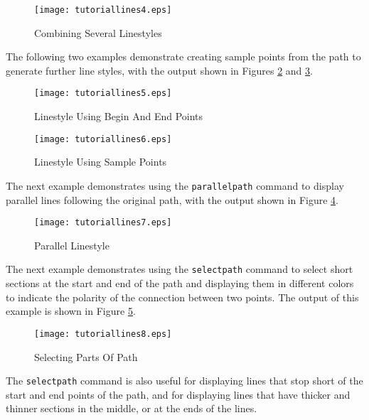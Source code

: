 \begin{figure}[htb]
\texttt{[image: tutoriallines4.eps]}
\caption{Combining Several Linestyles}
\label{tutoriallines4}
\end{figure}

The following two examples demonstrate creating sample points
from the path to generate further line styles,
with the output shown in Figures \ref{tutoriallines5}
and \ref{tutoriallines6}.



\begin{figure}[htb]
\texttt{[image: tutoriallines5.eps]}
\caption{Linestyle Using Begin And End Points}
\label{tutoriallines5}
\end{figure}



\begin{figure}[htb]
\texttt{[image: tutoriallines6.eps]}
\caption{Linestyle Using Sample Points}
\label{tutoriallines6}
\end{figure}

The next example demonstrates using the \texttt{parallelpath}
command to display parallel lines following the original path,
with the output shown in Figure \ref{tutoriallines7}.



\begin{figure}[htb]
\texttt{[image: tutoriallines7.eps]}
\caption{Parallel Linestyle}
\label{tutoriallines7}
\end{figure}

The next example demonstrates using the \texttt{selectpath}
command to select short sections at the start and end of
the path and displaying them in different colors to indicate
the polarity of the connection between two points.
The output of this example is shown in Figure \ref{tutoriallines8}.



\begin{figure}[htb]
\texttt{[image: tutoriallines8.eps]}
\caption{Selecting Parts Of Path}
\label{tutoriallines8}
\end{figure}

The \texttt{selectpath} command is also useful for displaying lines that stop
short of the start and end points of the path, and for displaying
lines that have thicker and thinner sections in the middle, or
at the ends of the lines.

